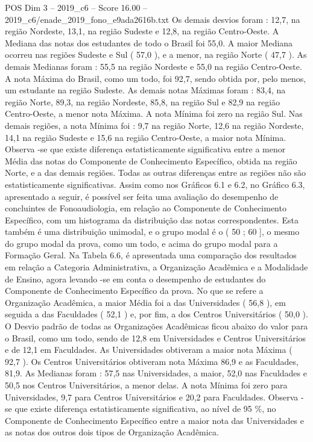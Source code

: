 \begin{textsample}{POS Dim 3 – 2019\_c6 – Score 16.00 – 2019\_c6/enade\_2019\_fono\_e9ada2616b.txt}
Os demais desvios foram : 12,7, na região Nordeste, 13,1, na região Sudeste e 12,8, na região Centro-Oeste.
A Mediana das notas dos estudantes de todo o Brasil foi 55,0.
A maior Mediana ocorreu nas regiões Sudeste e Sul ( 57,0 ), e a menor, na região Norte ( 47,7 ).
As demais Medianas foram : 55,5 na região Nordeste e 55,0 na região Centro-Oeste.
A nota Máxima do Brasil, como um todo, foi 92,7, sendo obtida por, pelo menos, um estudante na região Sudeste.
As demais notas Máximas foram : 83,4, na região Norte, 89,3, na região Nordeste, 85,8, na região Sul e 82,9 na região Centro-Oeste, a menor nota Máxima.
A nota Mínima foi zero na região Sul.
Nas demais regiões, a nota Mínima foi : 9,7 na região Norte, 12,6 na região Nordeste, 14,1 na região Sudeste e 15,6 na região Centro-Oeste, a maior nota Mínima.
Observa -se que existe diferença estatisticamente significativa entre a menor Média das notas do Componente de Conhecimento Específico, obtida na região Norte, e a das demais regiões.
Todas as outras diferenças entre as regiões não são estatisticamente significativas.
Assim como nos Gráficos 6.1 e 6.2, no Gráfico 6.3, apresentado a seguir, é possível ser feita uma avaliação do desempenho de concluintes de Fonoaudiologia, em relação ao Componente de Conhecimento Específico, com um histograma da distribuição das notas correspondentes.
Esta também é uma distribuição unimodal, e o grupo modal é o ( 50 ; 60 ], o mesmo do grupo modal da prova, como um todo, e acima do grupo modal para a Formação Geral.
Na Tabela 6.6, é apresentada uma comparação dos resultados em relação a Categoria Administrativa, a Organização Acadêmica e a Modalidade de Ensino, agora levando -se em conta o desempenho de estudantes do Componente de Conhecimento Específico da prova.
No que se refere a Organização Acadêmica, a maior Média foi a das Universidades ( 56,8 ), em seguida a das Faculdades ( 52,1 ) e, por fim, a dos Centros Universitários ( 50,0 ).
O Desvio padrão de todas as Organizações Acadêmicas ficou abaixo do valor para o Brasil, como um todo, sendo de 12,8 em Universidades e Centros Universitários e de 12,1 em Faculdades.
As Universidades obtiveram a maior nota Máxima ( 92,7 ).
Os Centros Universitários obtiveram nota Máxima 86,9 e as Faculdades, 81,9.
As Medianas foram : 57,5 nas Universidades, a maior, 52,0 nas Faculdades e 50,5 nos Centros Universitários, a menor delas.
A nota Mínima foi zero para Universidades, 9,7 para Centros Universitários e 20,2 para Faculdades.
Observa -se que existe diferença estatisticamente significativa, ao nível de 95 \%, no Componente de Conhecimento Específico entre a maior nota das Universidades e as notas dos outros dois tipos de Organização Acadêmica.

\end{textsample}
